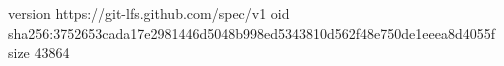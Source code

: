 version https://git-lfs.github.com/spec/v1
oid sha256:3752653cada17e2981446d5048b998ed5343810d562f48e750de1eeea8d4055f
size 43864
